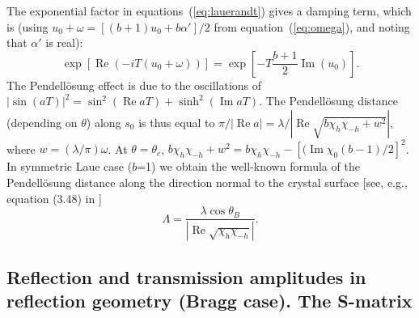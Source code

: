 \documentclass[preprint]{iucr}              %
\begin{document}
The exponential factor in equations~(\ref{eq:lauerandt}) gives a damping term, which is (using $u_0 +\omega=[(b+1)u_0+b\alpha']/2$ from equation~({\ref{eq:omega}}), 
and noting that $\alpha'$ is real):  
\begin{equation}
   \exp[\operatorname{Re}(-iT(u_0+\omega))] = 
    \exp[-T \frac{b+1}{2}\operatorname{Im}(u_0)].
\end{equation}
The Pendell\"osung effect is due to the oscillations of $|\sin(aT)|^2=\sin^2(\operatorname{Re} aT) + \sinh^2(\operatorname{Im}aT)$.
The Pendell\"osung distance (depending on $\theta$) along $s_0$ is thus equal to  
$\pi / |\operatorname{Re} a|=\lambda / |\operatorname{Re}\sqrt{b\chi_h\chi_{-h} + w^2}|$, where $w=(\lambda / \pi) \omega $.
At $\theta=\theta_c$, $b \chi_h \chi_{-h}+w^2=b \chi_h \chi_{-h} - [(\operatorname{Im}\chi_0(b-1)/2]^2$. In symmetric Laue case ($b$=1) we obtain the well-known formula of the Pendell\"osung distance along the direction normal to the crystal surface [see, e.g., equation (3.48) in \cite{pinskerbook}]
\begin{equation}\label{eq:Pendellosung}
    \Lambda =\frac{\lambda \cos\theta_B}{|\operatorname{Re}\sqrt{\chi_h\chi_{-h}}|} .
\end{equation}

\subsection{Reflection and transmission amplitudes in reflection geometry (Bragg case). The S-matrix}
\label{sec:TTsolutionsBragg}
\end{document}
